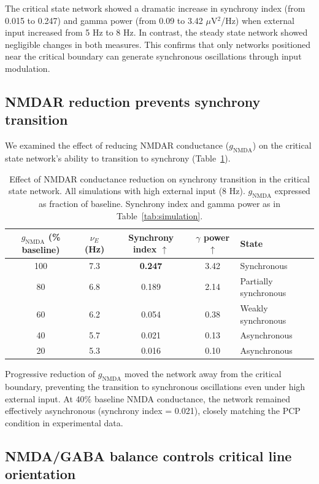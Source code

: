 \documentclass[11pt]{article}
\begin{document}
The critical state network showed a dramatic increase in synchrony index (from 0.015 to 0.247) and gamma power (from 0.09 to 3.42 $\mu$V$^2$/Hz) when external input increased from 5 Hz to 8 Hz. In contrast, the steady state network showed negligible changes in both measures. This confirms that only networks positioned near the critical boundary can generate synchronous oscillations through input modulation.

\subsection{NMDAR reduction prevents synchrony transition}

We examined the effect of reducing NMDAR conductance ($g_{\text{NMDA}}$) on the critical state network's ability to transition to synchrony (Table~\ref{tab:nmda}).

\begin{table}[H]
\centering
\caption{Effect of NMDAR conductance reduction on synchrony transition in the critical state network. All simulations with high external input (8 Hz). $g_{\text{NMDA}}$ expressed as fraction of baseline. Synchrony index and gamma power as in Table~\ref{tab:simulation}.}
\label{tab:nmda}
\begin{tabular}{ccccl}
\toprule
\textbf{$g_{\text{NMDA}}$ (\% baseline)} & \textbf{$\nu_E$ (Hz)} & \textbf{Synchrony index} $\uparrow$ & \textbf{$\gamma$ power} $\uparrow$ & \textbf{State} \\
\midrule
100 & 7.3 & \textbf{0.247} & 3.42 & Synchronous \\
80 & 6.8 & 0.189 & 2.14 & Partially synchronous \\
60 & 6.2 & 0.054 & 0.38 & Weakly synchronous \\
40 & 5.7 & 0.021 & 0.13 & Asynchronous \\
20 & 5.3 & 0.016 & 0.10 & Asynchronous \\
\bottomrule
\end{tabular}
\end{table}

Progressive reduction of $g_{\text{NMDA}}$ moved the network away from the critical boundary, preventing the transition to synchronous oscillations even under high external input. At 40\% baseline NMDA conductance, the network remained effectively asynchronous (synchrony index = 0.021), closely matching the PCP condition in experimental data.

\subsection{NMDA/GABA balance controls critical line orientation}
\end{document}
